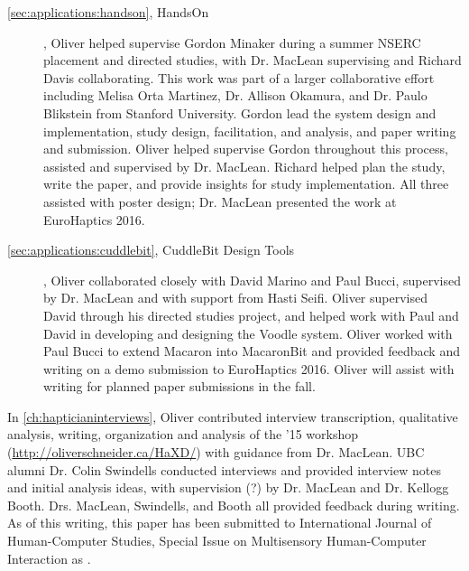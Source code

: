 \begin{description}
\item[\autoref{sec:applications:handson}, HandsOn], Oliver helped supervise Gordon Minaker during a summer NSERC placement and directed studies, with Dr. MacLean supervising and Richard Davis collaborating.
This work was part of a larger collaborative effort including Melisa Orta Martinez, Dr. Allison Okamura, and Dr. Paulo Blikstein from Stanford University.
Gordon lead the system design and implementation, study design, facilitation, and analysis, and paper writing and submission.
Oliver helped supervise Gordon throughout this process, assisted and supervised by Dr. MacLean.
Richard helped plan the study, write the paper, and provide insights for study implementation.
All three assisted with poster design; Dr. MacLean presented the work at EuroHaptics 2016.

\item[\autoref{sec:applications:cuddlebit}, CuddleBit Design Tools], Oliver collaborated closely with David Marino and Paul Bucci, supervised by Dr. MacLean and with support from Hasti Seifi.
Oliver supervised David through his directed studies project, and helped work with Paul and David in developing and designing the Voodle system.
Oliver worked with Paul Bucci to extend Macaron into MacaronBit and provided feedback and writing on a demo submission to EuroHaptics 2016. 
Oliver will assist with writing for planned paper submissions in the fall.

\end{description}


In \autoref{ch:hapticianinterviews}, Oliver contributed interview transcription, qualitative analysis, writing, organization and analysis of the \haxd '15 workshop (\url{http://oliverschneider.ca/HaXD/}) with guidance from Dr. MacLean.
UBC alumni Dr. Colin Swindells conducted interviews and provided interview notes and initial analysis ideas, with supervision (?) by Dr. MacLean and Dr. Kellogg Booth.
Drs. MacLean, Swindells, and Booth all provided feedback during writing.
As of this writing, this paper has been submitted to International Journal of Human-Computer Studies, Special Issue on Multisensory Human-Computer Interaction as \citet{}.









